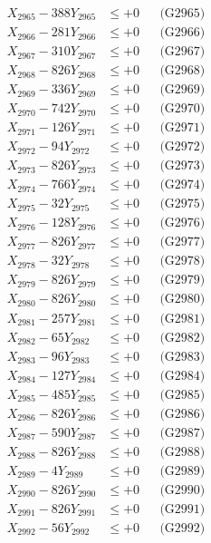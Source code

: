 \documentclass[a4paper,10pt]{article}
\begin{document}
{\begin{align}
X_{2965} - 388Y_{2965} &\leq +0 && \text{(G2965)} \\
X_{2966} - 281Y_{2966} &\leq +0 && \text{(G2966)} \\
X_{2967} - 310Y_{2967} &\leq +0 && \text{(G2967)} \\
X_{2968} - 826Y_{2968} &\leq +0 && \text{(G2968)} \\
X_{2969} - 336Y_{2969} &\leq +0 && \text{(G2969)} \\
X_{2970} - 742Y_{2970} &\leq +0 && \text{(G2970)} \\
\allowbreak
X_{2971} - 126Y_{2971} &\leq +0 && \text{(G2971)} \\
X_{2972} - 94Y_{2972} &\leq +0 && \text{(G2972)} \\
X_{2973} - 826Y_{2973} &\leq +0 && \text{(G2973)} \\
X_{2974} - 766Y_{2974} &\leq +0 && \text{(G2974)} \\
X_{2975} - 32Y_{2975} &\leq +0 && \text{(G2975)} \\
X_{2976} - 128Y_{2976} &\leq +0 && \text{(G2976)} \\
X_{2977} - 826Y_{2977} &\leq +0 && \text{(G2977)} \\
X_{2978} - 32Y_{2978} &\leq +0 && \text{(G2978)} \\
X_{2979} - 826Y_{2979} &\leq +0 && \text{(G2979)} \\
X_{2980} - 826Y_{2980} &\leq +0 && \text{(G2980)} \\
\allowbreak
X_{2981} - 257Y_{2981} &\leq +0 && \text{(G2981)} \\
X_{2982} - 65Y_{2982} &\leq +0 && \text{(G2982)} \\
X_{2983} - 96Y_{2983} &\leq +0 && \text{(G2983)} \\
X_{2984} - 127Y_{2984} &\leq +0 && \text{(G2984)} \\
X_{2985} - 485Y_{2985} &\leq +0 && \text{(G2985)} \\
X_{2986} - 826Y_{2986} &\leq +0 && \text{(G2986)} \\
X_{2987} - 590Y_{2987} &\leq +0 && \text{(G2987)} \\
X_{2988} - 826Y_{2988} &\leq +0 && \text{(G2988)} \\
X_{2989} - 4Y_{2989} &\leq +0 && \text{(G2989)} \\
X_{2990} - 826Y_{2990} &\leq +0 && \text{(G2990)} \\
\allowbreak
X_{2991} - 826Y_{2991} &\leq +0 && \text{(G2991)} \\
X_{2992} - 56Y_{2992} &\leq +0 && \text{(G2992)} \\

\end{align}}
\end{document}
